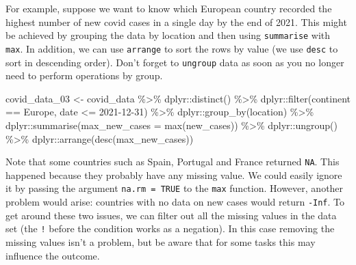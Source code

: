 \documentclass[
]{book}
\newenvironment{Shaded}{\begin{snugshade}}{\end{snugshade}}
\newcommand{\AttributeTok}[1]{\textcolor[rgb]{0.77,0.63,0.00}{#1}}
\newcommand{\FunctionTok}[1]{\textcolor[rgb]{0.00,0.00,0.00}{#1}}
\newcommand{\NormalTok}[1]{#1}
\newcommand{\OtherTok}[1]{\textcolor[rgb]{0.56,0.35,0.01}{#1}}
\newcommand{\SpecialCharTok}[1]{\textcolor[rgb]{0.00,0.00,0.00}{#1}}
\newcommand{\StringTok}[1]{\textcolor[rgb]{0.31,0.60,0.02}{#1}}
\begin{document}
For example, suppose we want to know which European country recorded the highest number of new covid cases in a single day by the end of 2021. This might be achieved by grouping the data by location and then using \texttt{summarise} with \texttt{max}. In addition, we can use \texttt{arrange} to sort the rows by value (we use \texttt{desc} to sort in descending order). Don't forget to \texttt{ungroup} data as soon as you no longer need to perform operations by group.

\begin{Shaded}
\begin{Highlighting}[]
\NormalTok{covid\_data\_03 }\OtherTok{\textless{}{-}}\NormalTok{ covid\_data }\SpecialCharTok{\%\textgreater{}\%} 
\NormalTok{  dplyr}\SpecialCharTok{::}\FunctionTok{distinct}\NormalTok{() }\SpecialCharTok{\%\textgreater{}\%} 
\NormalTok{  dplyr}\SpecialCharTok{::}\FunctionTok{filter}\NormalTok{(continent }\SpecialCharTok{==} \StringTok{\textquotesingle{}Europe\textquotesingle{}}\NormalTok{,}
\NormalTok{                date }\SpecialCharTok{\textless{}=} \StringTok{\textquotesingle{}2021{-}12{-}31\textquotesingle{}}\NormalTok{) }\SpecialCharTok{\%\textgreater{}\%} 
\NormalTok{  dplyr}\SpecialCharTok{::}\FunctionTok{group\_by}\NormalTok{(location) }\SpecialCharTok{\%\textgreater{}\%} 
\NormalTok{  dplyr}\SpecialCharTok{::}\FunctionTok{summarise}\NormalTok{(}\AttributeTok{max\_new\_cases =} \FunctionTok{max}\NormalTok{(new\_cases)) }\SpecialCharTok{\%\textgreater{}\%} 
\NormalTok{  dplyr}\SpecialCharTok{::}\FunctionTok{ungroup}\NormalTok{() }\SpecialCharTok{\%\textgreater{}\%} 
\NormalTok{  dplyr}\SpecialCharTok{::}\FunctionTok{arrange}\NormalTok{(}\FunctionTok{desc}\NormalTok{(max\_new\_cases))}
\end{Highlighting}
\end{Shaded}

Note that some countries such as Spain, Portugal and France returned \texttt{NA}. This happened because they probably have any missing value. We could easily ignore it by passing the argument \texttt{na.rm\ =\ TRUE} to the \texttt{max} function. However, another problem would arise: countries with no data on new cases would return \texttt{-Inf}. To get around these two issues, we can filter out all the missing values in the data set (the \texttt{!} before the condition works as a negation). In this case removing the missing values isn't a problem, but be aware that for some tasks this may influence the outcome.
\end{document}

